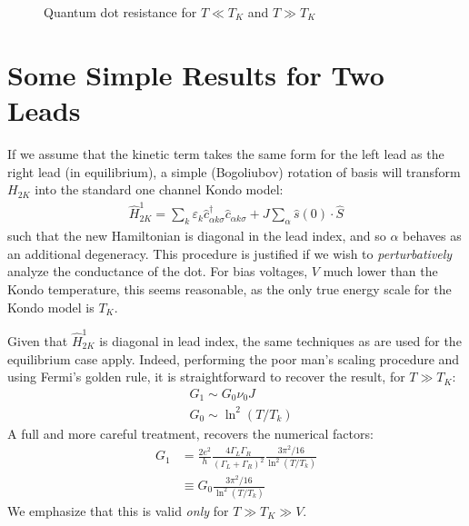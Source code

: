 \documentclass[twocolumn]{el-author}
\newcommand{\hH}{\hat{H}}
\newcommand{\D}{^\dagger}
\begin{document}
\begin{figure}
\caption{Quantum dot resistance for $T\ll T_{K}$ and $T\gg T_{K}$
}\label{kondodotresistance}
\end{figure}


\section{Some Simple Results for Two Leads}
If we assume that the kinetic term takes the same form for the left lead as the right lead (in equilibrium), a simple (Bogoliubov) rotation of basis will transform $H_{2K}$ into the standard one channel Kondo model:
\begin{align}\label{kondolies}
  \hH_{2K}^{1}=\sum_{k}\varepsilon_{k}\hat{c}_{\alpha k\sigma}\D\hat{c}_{\alpha k\sigma}+
  J\sum_{\alpha}\hat{s}(0)\cdot\hat{S}
\end{align}
such that the new Hamiltonian is diagonal in the lead index, and so $\alpha$ behaves as an additional degeneracy.  This procedure is justified if we wish to \emph{perturbatively} analyze the conductance of the dot.  For bias voltages, $V$ much lower than the Kondo temperature, this seems reasonable, as the only true energy scale for the Kondo model is $T_{K}$.

Given that $\hH_{2K}^{1}$ is diagonal in lead index, the same techniques as are used for the equilibrium case apply.  Indeed, performing the poor man's scaling procedure and using Fermi's golden rule, it is straightforward to recover the result, for $T\gg T_{K}$:
\begin{align}
  &G_{1}\sim G_{0}\nu_{0}J\nonumber\\
  &G_{0}\sim{\ln^{2}(T/T_{k})}
\end{align}
A full and more careful treatment, recovers the numerical factors:
\begin{align}
  G_{1}&=\frac{2e^{2}}{h}\frac{4\Gamma_{L}\Gamma_{R}}{(\Gamma_{L}+\Gamma_{R})^{2}}\frac{3\pi^{2}/16}{\ln^{2}(T/T_{k})}\nonumber\\
  &\equiv G_{0}\frac{3\pi^{2}/16}{\ln^{2}(T/T_{k})}
\end{align}
We emphasize that this is valid \emph{only} for $T\gg T_{K}\gg V$.
\end{document}
